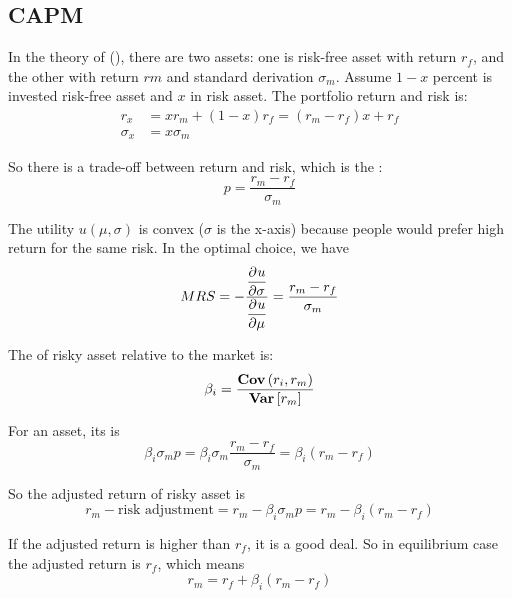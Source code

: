 \subsection{CAPM}

In the theory of  (), there are two assets: one is risk-free asset with return $r_f$, and the other with return $rm$ and standard derivation $\sigma_m$. Assume $1-x$ percent is invested risk-free asset and $x$ in risk asset. The portfolio return and risk is:
\begin{equation}
    \begin{aligned}
        r_x &= x r_m + (1-x) r_f = (r_m - r_f) x + r_f \\
        \sigma_x &= x \sigma_m
    \end{aligned}
\end{equation}

So there is a trade-off between return and risk, which is the :
\begin{equation}
    p = \frac{r_m - r_f}{\sigma_m}
\end{equation}

The utility $u(\mu,\sigma)$ is convex ($\sigma$ is the x-axis) because people would prefer high return for the same risk. In the optimal choice, we have 
\begin{equation}
    MRS = - \frac{\dpd{u}{\sigma}}{\dpd{u}{\mu}} = \frac{r_m - r_f}{\sigma_m}
\end{equation}

The  of risky asset relative to the market is:
\begin{equation}
    \beta_i = \frac{\mathop{\bf Cov\/}\displaystyle \left(r_i,r_m \right)}{\mathop{\bf Var\/}\displaystyle \left[ r_m \right]}
\end{equation}

For an asset, its  is
\begin{equation}
    \beta_i \sigma_m p = \beta_i \sigma_m \frac{r_m - r_f}{\sigma_m} = \beta_i (r_m - r_f)
\end{equation}

So the adjusted return of risky asset is
\begin{equation}
    r_m - \text{risk adjustment} = r_m - \beta_i \sigma_m p  = r_m - \beta_i (r_m - r_f)
\end{equation}

If the adjusted return is higher than $r_f$, it is a good deal. So in equilibrium case the adjusted return is $r_f$, which means
\begin{equation}
    r_m = r_f + \beta_i (r_m - r_f)
\end{equation}









